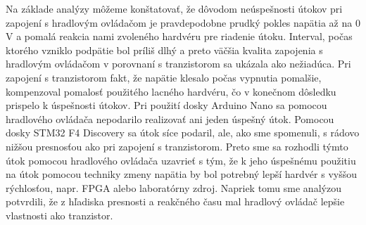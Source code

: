 Na základe analýzy môžeme konštatovať, že dôvodom neúspešnosti útokov pri zapojení s hradlovým ovládačom je pravdepodobne prudký pokles napätia až na 0 V a pomalá reakcia nami zvoleného hardvéru pre riadenie útoku. Interval, počas ktorého vzniklo podpätie bol príliš dlhý a preto väčšia kvalita zapojenia s hradlovým ovládačom v porovnaní s tranzistorom sa ukázala ako nežiadúca. Pri zapojení s tranzistorom fakt, že napätie klesalo počas vypnutia pomalšie, kompenzoval pomalosť použitého lacného hardvéru, čo v konečnom dôsledku prispelo k úspešnosti útokov. Pri použití dosky Arduino Nano sa pomocou hradlového ovládača nepodarilo realizovať ani jeden úspešný útok. Pomocou dosky STM32 F4 Discovery sa útok síce podaril, ale, ako sme spomenuli, s rádovo nižšou presnosťou ako pri zapojení s tranzistorom. Preto sme sa rozhodli týmto útok pomocou hradlového ovládača uzavrieť s tým, že k jeho úspešnému použitiu na útok pomocou techniky zmeny napätia by bol potrebný lepší hardvér s vyššou rýchlosťou, napr. FPGA alebo laboratórny zdroj. Napriek tomu sme analýzou potvrdili, že z hľadiska presnosti a reakčného času mal hradlový ovládač lepšie vlastnosti ako tranzistor.